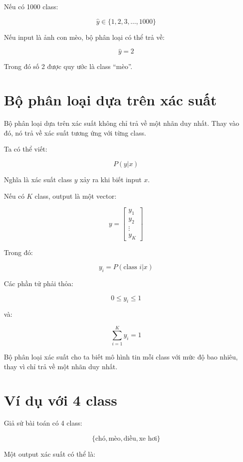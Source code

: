 \documentclass[12pt,a4paper]{report}
\begin{document}
Nếu có 1000 class:

\[
    \hat{y} \in \{1,2,3,\ldots,1000\}
\]

\begin{vidu}
Nếu input là ảnh con mèo, bộ phân loại có thể trả về:

\[
    \hat{y}=2
\]

Trong đó số 2 được quy ước là class ``mèo''.
\end{vidu}

\section{Bộ phân loại dựa trên xác suất}

Bộ phân loại dựa trên xác suất không chỉ trả về một nhãn duy nhất. Thay vào đó, nó trả về xác suất tương ứng với từng class.

Ta có thể viết:

\[
    P(y|x)
\]

Nghĩa là xác suất class $y$ xảy ra khi biết input $x$.

Nếu có $K$ class, output là một vector:

\[
    y =
    \begin{bmatrix}
    y_1\\
    y_2\\
    \vdots\\
    y_K
    \end{bmatrix}
\]

Trong đó:

\[
    y_i = P(\text{class } i | x)
\]

Các phần tử phải thỏa:

\[
    0 \leq y_i \leq 1
\]

và:

\[
    \sum_{i=1}^{K} y_i = 1
\]

\begin{ghinho}
Bộ phân loại xác suất cho ta biết mô hình tin mỗi class với mức độ bao nhiêu, thay vì chỉ trả về một nhãn duy nhất.
\end{ghinho}

\section{Ví dụ với 4 class}

Giả sử bài toán có 4 class:

\[
    \{\text{chó}, \text{mèo}, \text{diều}, \text{xe hơi}\}
\]

Một output xác suất có thể là:
\end{document}
